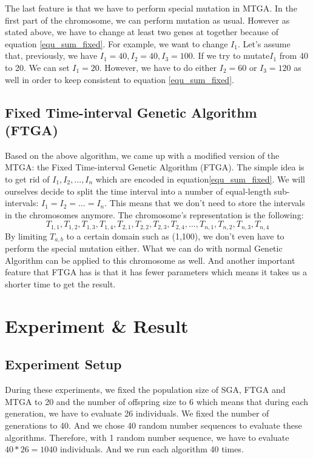 \documentclass{article} %
\begin{document}
The last feature is that we have to perform special mutation in MTGA. In the first part of the chromosome, we can perform mutation as usual. However as stated above, we have to change at least two genes at together because of equation \ref{equ_sum_fixed}. For example, we want to change ${I_1}$. Let's assume that, previously, we have $I_1 = 40, I_2 = 40, I_3 = 100$. If we try to mutate$I_1$ from 40 to 20. We can set $I_1 = 20$. However, we have to do either $I_2=60$ or $I_3=120$ as well in order to keep consistent to equation \ref{equ_sum_fixed}. 


\subsection{Fixed Time-interval Genetic Algorithm (FTGA)}
Based on the above algorithm, we came up with a modified version of the MTGA: the Fixed Time-interval Genetic Algorithm (FTGA). The simple idea is to get rid of $I_1, I_2, ..., I_n$ which are encoded in equation\ref{equ_sum_fixed}. We will ourselves decide to split the time interval into a number of equal-length sub-intervals: $I_1=I_2=...=I_n$. This means that we don't need to store the intervals in the chromosomes anymore. The chromosome's representation is the following:
\begin{equation}
T_{1,1}, T_{1,2}, T_{1,3}, T_{1,4},T_{2,1}, T_{2,2}, T_{2,3}, T_{2,4},...,T_{n,1}, T_{n, 2},T_{n,3}, T_{n, 4}
\end{equation}
By limiting $T_{a,b}$ to a certain domain such as (1,100), we don't even have to perform the special mutation either. What we can do with normal Genetic Algorithm can be applied to this chromosome as well. And another important feature that FTGA has is that it has fewer parameters which means it takes us a shorter time to get the result. 


\section{Experiment \& Result}
\subsection{Experiment Setup}
During these experiments, we fixed the population size of SGA, FTGA and MTGA to 20 and the number of offspring size to 6 which means that during each generation, we have to evaluate 26 individuals. We fixed the number of generations to 40. And we chose 40 random number sequences to evaluate these algorithms. Therefore, with 1 random number sequence, we have to evaluate $40 * 26 = 1040$ individuals. And we run each algorithm 40 times.
\end{document}
